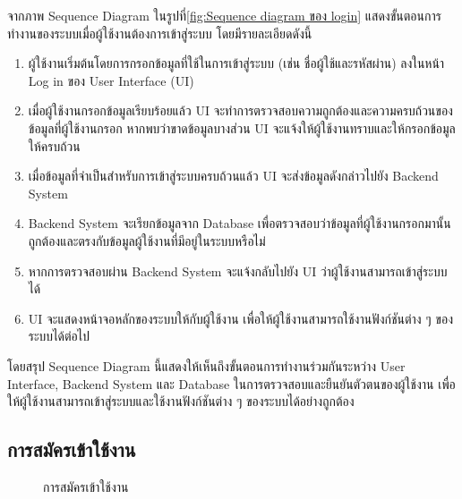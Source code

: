 \documentclass[14pt,oneside,openright,a4paper]{cpe-thai-project}
\begin{document}
จากภาพ Sequence Diagram ในรูปที่\ref{fig:Sequence diagram ของ login} แสดงขั้นตอนการทำงานของระบบเมื่อผู้ใช้งานต้องการเข้าสู่ระบบ โดยมีรายละเอียดดังนี้
  \begin{enumerate}
    \item ผู้ใช้งานเริ่มต้นโดยการกรอกข้อมูลที่ใช้ในการเข้าสู่ระบบ (เช่น ชื่อผู้ใช้และรหัสผ่าน) ลงในหน้า Log in ของ User Interface (UI)
    \item เมื่อผู้ใช้งานกรอกข้อมูลเรียบร้อยแล้ว UI จะทำการตรวจสอบความถูกต้องและความครบถ้วนของข้อมูลที่ผู้ใช้งานกรอก หากพบว่าขาดข้อมูลบางส่วน UI จะแจ้งให้ผู้ใช้งานทราบและให้กรอกข้อมูลให้ครบถ้วน
    \item เมื่อข้อมูลที่จำเป็นสำหรับการเข้าสู่ระบบครบถ้วนแล้ว UI จะส่งข้อมูลดังกล่าวไปยัง Backend System
    \item Backend System จะเรียกข้อมูลจาก Database เพื่อตรวจสอบว่าข้อมูลที่ผู้ใช้งานกรอกมานั้นถูกต้องและตรงกับข้อมูลผู้ใช้งานที่มีอยู่ในระบบหรือไม่
    \item หากการตรวจสอบผ่าน Backend System จะแจ้งกลับไปยัง UI ว่าผู้ใช้งานสามารถเข้าสู่ระบบได้
    \item UI จะแสดงหน้าจอหลักของระบบให้กับผู้ใช้งาน เพื่อให้ผู้ใช้งานสามารถใช้งานฟังก์ชันต่าง ๆ ของระบบได้ต่อไป
  \end{enumerate}
  โดยสรุป Sequence Diagram นี้แสดงให้เห็นถึงขั้นตอนการทำงานร่วมกันระหว่าง User Interface, Backend System และ Database ในการตรวจสอบและยืนยันตัวตนของผู้ใช้งาน เพื่อให้ผู้ใช้งานสามารถเข้าสู่ระบบและใช้งานฟังก์ชันต่าง ๆ ของระบบได้อย่างถูกต้อง

\subsection{การสมัครเข้าใช้งาน}

  \begin{figure}[!h]\centering
    \setlength{\fboxrule}{0.5mm} %
    \setlength{\fboxsep}{0.5cm}
    \caption{\centering การสมัครเข้าใช้งาน}\label{fig:regis}
  \end{figure}
\end{document}
